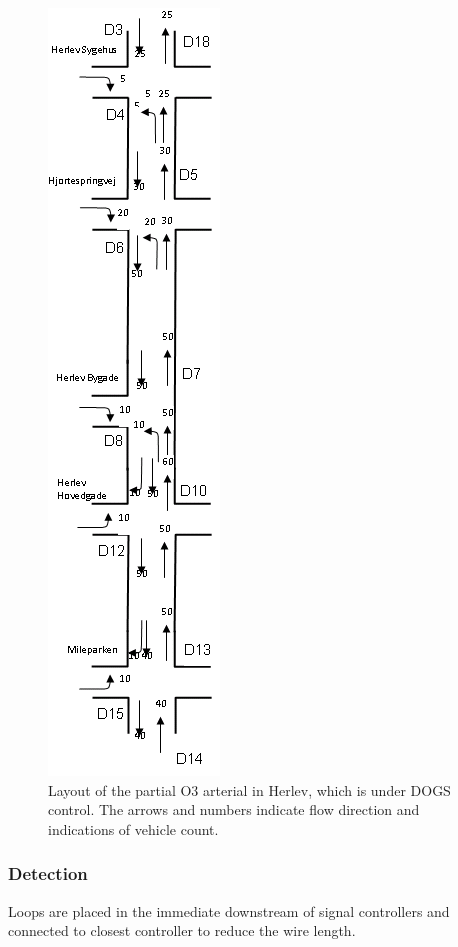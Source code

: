 \begin{figure}[!ht]
\begin{center}
\includegraphics[scale=0.5]{dogs_herlev.png} 
\end{center}
\caption{Layout of the partial O3 arterial in Herlev, which is under DOGS control. The arrows and numbers indicate flow direction and indications of vehicle count.}
\label{fig:dogs_herlev}
\end{figure}

\subsubsection*{Detection}
Loops are placed in the immediate downstream of signal controllers and connected to closest controller to reduce the wire length. 


